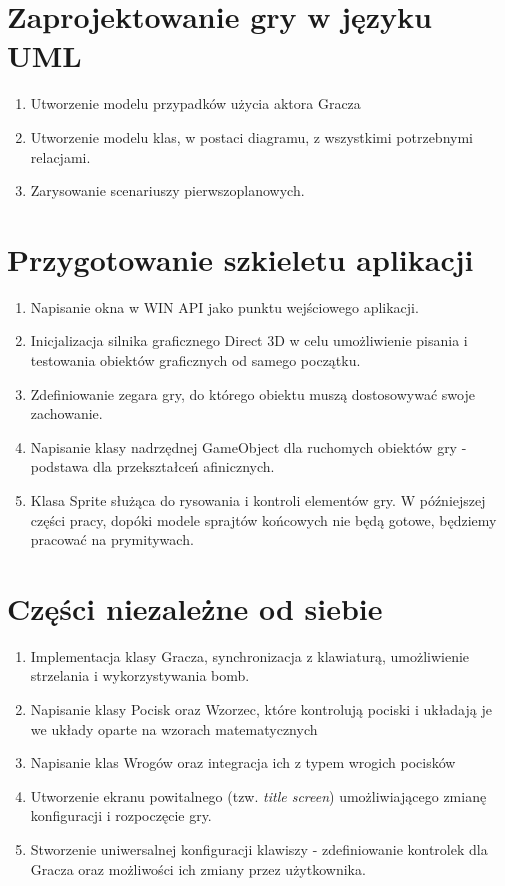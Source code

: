 \documentclass[a4paper,twoside]{article}
\begin{document}
		\section{Zaprojektowanie gry w języku UML}
			\begin{enumerate}[label=\alph*.]
				\item Utworzenie modelu przypadków użycia aktora Gracza
				\item Utworzenie modelu klas, w postaci diagramu, z wszystkimi potrzebnymi relacjami.
				\item Zarysowanie scenariuszy pierwszoplanowych.
			\end{enumerate}
		\section{Przygotowanie szkieletu aplikacji}
			\begin{enumerate}[label=\alph*.]
				\item Napisanie okna w WIN API jako punktu wejściowego aplikacji.
				\item Inicjalizacja silnika graficznego Direct 3D w celu umożliwienie pisania i testowania obiektów graficznych od samego początku.
				\item Zdefiniowanie zegara gry, do którego obiektu muszą dostosowywać swoje zachowanie.
				\item Napisanie klasy nadrzędnej GameObject dla ruchomych obiektów gry - podstawa dla przekształceń afinicznych.
				\item Klasa Sprite służąca do rysowania i kontroli elementów gry. W późniejszej części pracy, dopóki modele sprajtów końcowych nie będą gotowe, będziemy pracować na prymitywach.
			\end{enumerate}
		\section{Części niezależne od siebie}
			\begin{enumerate}[label=\alph*.]
				\item Implementacja klasy Gracza, synchronizacja z klawiaturą, umożliwienie strzelania i wykorzystywania bomb.
				\item Napisanie klasy Pocisk oraz Wzorzec, które kontrolują pociski i układają je we układy oparte na wzorach matematycznych
				\item Napisanie klas Wrogów oraz integracja ich z typem wrogich pocisków
				\item Utworzenie ekranu powitalnego (tzw. \emph{title screen}) umożliwiającego zmianę konfiguracji i rozpoczęcie gry.
				\item Stworzenie uniwersalnej konfiguracji klawiszy - zdefiniowanie kontrolek dla Gracza oraz możliwości ich zmiany przez użytkownika.
			\end{enumerate}
\end{document}
